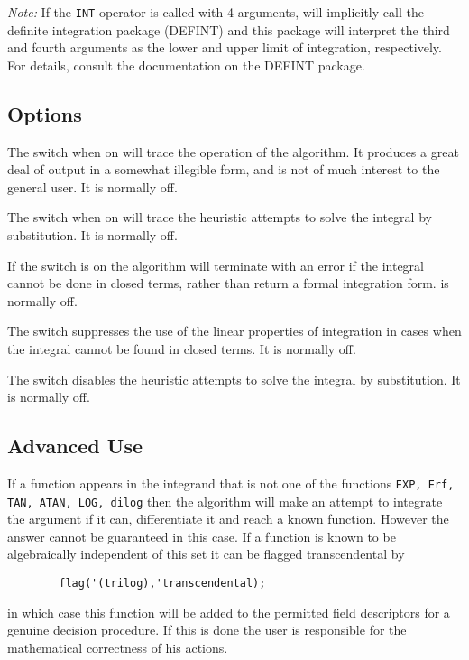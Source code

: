 \textit{Note:} If the \texttt{INT} operator is called with 4 arguments,
{\REDUCE} will implicitly call the definite integration package (DEFINT)
and this package will interpret the third and fourth arguments as the lower
and upper limit of integration, respectively.  For details, consult
the documentation on the DEFINT package.


\subsection{Options}
\hypertarget{switch:TRINT}{}
\hypertarget{switch:TRINTSUBST}{}
\hypertarget{switch:FAILHARD}{}
\hypertarget{switch:NOLNR}{}
\hypertarget{switch:NOINTSUBST}{}

The switch  when on will trace the operation of the algorithm. It
produces a great deal of output in a somewhat illegible form, and is not
of much interest to the general user. It is normally off.

The switch  when on will trace the heuristic attempts to
solve the integral by substitution. It is normally off.

If the switch  is on the algorithm will terminate with an
error if the integral cannot be done in closed terms, rather than return a
formal integration form.  is normally off.

The switch  suppresses the use of the linear properties of
integration in cases when the integral cannot be found in closed terms.
It is normally off.

The switch  disables the heuristic attempts to solve
the integral by substitution. It is normally off.

\subsection{Advanced Use}
\hypertarget{operator:ERF}{}

If a function appears in the integrand that is not one of the functions
\texttt{EXP, Erf, TAN, ATAN, LOG, dilog}
then the algorithm will make an
attempt to integrate the argument if it can, differentiate it and reach a
known function.  However the answer cannot be guaranteed in this case.  If
a function is known to be algebraically independent of this set it can be
flagged transcendental by
\begin{verbatim}
        flag('(trilog),'transcendental);
\end{verbatim}
in which case this function will be added to the permitted field
descriptors for a genuine decision procedure. If this is done the user is
responsible for the mathematical correctness of his actions.

